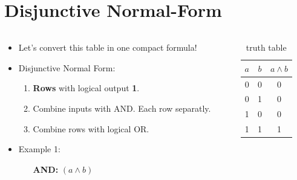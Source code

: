 \documentclass{beamer}
\begin{document}
\section{Disjunctive Normal-Form}
\begin{frame}
  
  \begin{columns}
  \begin{column}{6cm}
  \begin{itemize}
    \item Let's convert this table in one compact formula!
    \item Disjunctive Normal Form:
    \begin{enumerate}
     \item \textbf{Rows} with logical output \textbf{1}.
     \item Combine inputs with AND. Each row separatly.
     \item Combine rows with logical OR.
    \end{enumerate}

    
    \item Example 1: 
    \begin{itemize}
      \item [\textbf{AND:}]$(a\land b)$
    \end{itemize}
  \end{itemize}
  \end{column}
  
    
  \begin{column}{6cm}
  \begin{table}[H]
  \centering
  \begin{tabular}{c|c||c}
  \textbf{$a$} & \textbf{$b$} & \textbf{$a\land b$} \\ \hline
  0          & 0          & 0      \\
  0          & 1          & 0  \\
  1          & 0          & 0   \\
  1          & 1          & 1 
  \end{tabular}
  \caption{truth table}
  \label{tab:truth}
  \end{table}
  \end{column}
  
  \end{columns}  
\end{frame}
\end{document}
